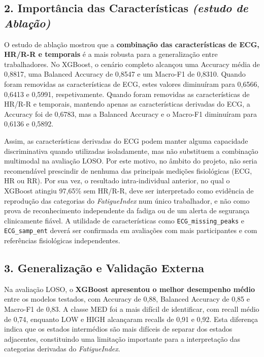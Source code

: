\subsection*{2. Importância das Características \textmd{\textit{(estudo de Ablação)}}}

O estudo de ablação mostrou que a \textbf{combinação das características de ECG, HR/R-R e temporais} é a mais robusta para a generalização entre trabalhadores. No XGBoost, o cenário completo alcançou uma Accuracy média de 0,8817, uma Balanced Accuracy de 0,8547 e um Macro-F1 de 0,8310. Quando foram removidas as características de ECG, estes valores diminuíram para 0,6566, 0,6413 e 0,5991, respetivamente. Quando foram removidas as características de HR/R-R e temporais, mantendo apenas as características derivadas do ECG, a Accuracy foi de 0,6783, mas a Balanced Accuracy e o Macro-F1 diminuíram para 0,6136 e 0,5892.

Assim, as características derivadas do ECG podem manter alguma capacidade discriminativa quando utilizadas isoladamente, mas não substituem a combinação multimodal na avaliação LOSO. Por este motivo, no âmbito do projeto, não seria recomendável prescindir de nenhuma das principais medições fisiológicas (ECG, HR ou RR). Por sua vez, o resultado intra-individual anterior, no qual o XGBoost atingiu 97,65\% sem HR/R-R, deve ser interpretado como evidência de reprodução das categorias do \textit{FatigueIndex} num único trabalhador, e não como prova de reconhecimento independente da fadiga ou de um alerta de segurança clinicamente fiável. A utilidade de características como \texttt{ECG\_missing\_peaks} e \texttt{ECG\_samp\_ent} deverá ser confirmada em avaliações com mais participantes e com referências fisiológicas independentes.

\subsection*{3. Generalização e Validação Externa}

Na avaliação LOSO, o \textbf{XGBoost apresentou o melhor desempenho médio} entre os modelos testados, com Accuracy de 0,88, Balanced Accuracy de 0,85 e Macro-F1 de 0,83. A classe MED foi a mais difícil de identificar, com recall médio de 0,74, enquanto LOW e HIGH alcançaram recalls de 0,91 e 0,92. Esta diferença indica que os estados intermédios são mais difíceis de separar dos estados adjacentes, constituindo uma limitação importante para a interpretação das categorias derivadas do \textit{FatigueIndex}.

